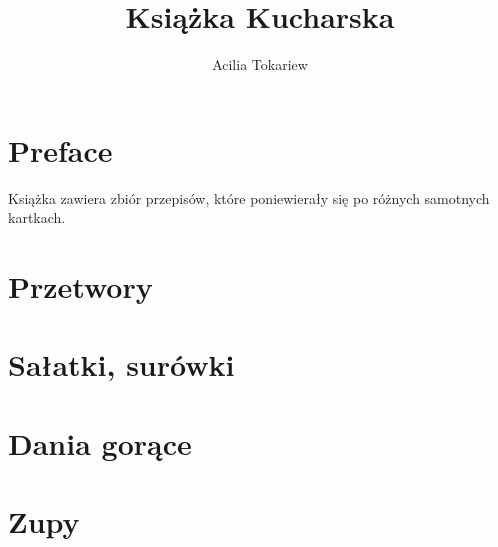 \documentclass[14pt,twoside,parskip=half*]{scrbook}
\title{Książka Kucharska}
\author{Acilia Tokariew}
\begin{document}
\frontmatter{}
\maketitle{}
\tableofcontents{}
\chapter{Preface}
Książka zawiera zbiór przepisów, które poniewierały się po różnych samotnych
kartkach.

\mainmatter{}

\chapter{Przetwory}

\label{ch:przetwory}

\chapter{Sałatki, surówki}

\label{ch:salatki-surowki}

\chapter{Dania gorące}

\label{ch:dania-gorace}

\chapter{Zupy}

\label{ch:zupy}
\end{document}
